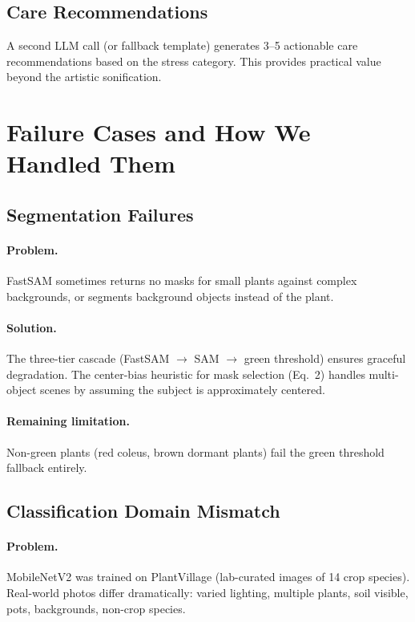 \documentclass[11pt,a4paper,twocolumn]{article}
\begin{document}
\subsection{Care Recommendations}

A second LLM call (or fallback template) generates 3--5 actionable care recommendations based on the stress category. This provides practical value beyond the artistic sonification.


\section{Failure Cases and How We Handled Them}
\label{sec:failures}

\subsection{Segmentation Failures}

\paragraph{Problem.} FastSAM sometimes returns no masks for small plants against complex backgrounds, or segments background objects instead of the plant.

\paragraph{Solution.} The three-tier cascade (FastSAM $\to$ SAM $\to$ green threshold) ensures graceful degradation. The center-bias heuristic for mask selection (Eq.~2) handles multi-object scenes by assuming the subject is approximately centered.

\paragraph{Remaining limitation.} Non-green plants (red coleus, brown dormant plants) fail the green threshold fallback entirely.

\subsection{Classification Domain Mismatch}

\paragraph{Problem.} MobileNetV2 was trained on PlantVillage (lab-curated images of 14 crop species). Real-world photos differ dramatically: varied lighting, multiple plants, soil visible, pots, backgrounds, non-crop species.
\end{document}
